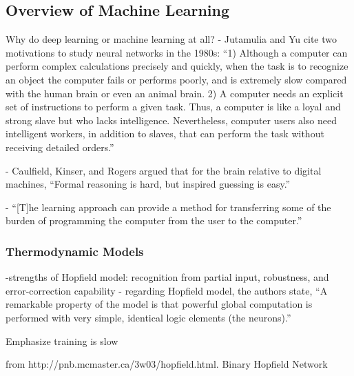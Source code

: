 \subsection{\label{sec:overview_of_machine_learning}Overview of Machine Learning}

Why do deep learning or machine learning at all?
-\cite{juya1996} Jutamulia and Yu cite two motivations to study neural networks in the 1980s: ``1) Although a computer can perform complex calculations precisely and quickly, when the task is to recognize an object the computer fails or performs poorly, and is extremely slow compared with the human brain or even an animal brain. 2) A computer needs an explicit set of instructions to perform a given task. Thus, a computer is like a loyal and strong slave but who lacks intelligence. Nevertheless, computer users also need intelligent workers, in addition to slaves, that can perform the task without receiving detailed orders.''

-\cite{caki1989} Caulfield, Kinser, and Rogers argued that for the brain relative to digital machines, ``Formal reasoning is hard, but inspired guessing is easy.''

- \cite{psbr1990} ``[T]he learning approach can provide a method for transferring some of the burden of programming the computer from the user to the computer.''

\cite{mcpi1943}

\cite{ro1958}

\subsubsection{Thermodynamic Models}
\cite{ho1982}

-strengths of Hopfield model: recognition from partial input, robustness, and error-correction capability \cite{psfa1985}
-\cite{faps1985} regarding Hopfield model, the authors state, ``A remarkable property of the model is that powerful global computation is performed with very simple, identical logic elements (the neurons).''

Emphasize training is slow

from http://pnb.mcmaster.ca/3w03/hopfield.html.
Binary Hopfield Network

